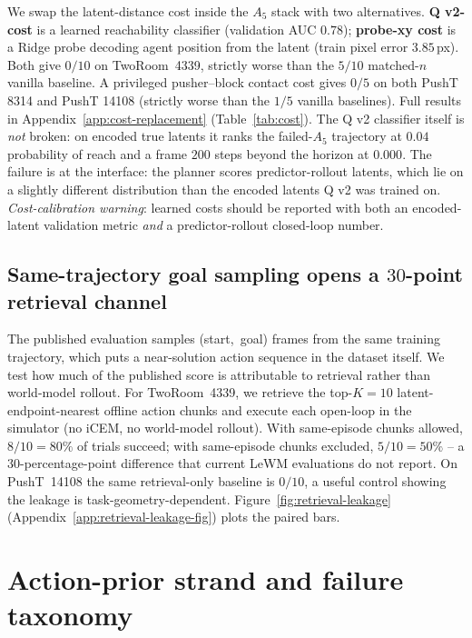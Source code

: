 \documentclass{article}
\begin{document}
We swap the latent-distance cost inside the $A_5$ stack with two alternatives. \textbf{Q v2-cost} is a learned reachability classifier (validation AUC $0.78$); \textbf{probe-xy cost} is a Ridge probe decoding agent position from the latent (train pixel error $3.85$\,px). Both give $0/10$ on TwoRoom~4339, strictly worse than the $5/10$ matched-$n$ vanilla baseline. A privileged pusher--block contact cost gives $0/5$ on both PushT 8314 and PushT 14108 (strictly worse than the $1/5$ vanilla baselines). Full results in Appendix~\ref{app:cost-replacement} (Table~\ref{tab:cost}). The Q v2 classifier itself is \emph{not} broken: on encoded true latents it ranks the failed-$A_5$ trajectory at $0.04$ probability of reach and a frame $200$ steps beyond the horizon at $0.000$. The failure is at the interface: the planner scores predictor-rollout latents, which lie on a slightly different distribution than the encoded latents Q v2 was trained on. \emph{Cost-calibration warning}: learned costs should be reported with both an encoded-latent validation metric \emph{and} a predictor-rollout closed-loop number.

\subsection{Same-trajectory goal sampling opens a $30$-point retrieval channel}
\label{subsec:leakage}

The published evaluation samples (start,~goal) frames from the same training trajectory, which puts a near-solution action sequence in the dataset itself. We test how much of the published score is attributable to retrieval rather than world-model rollout. For TwoRoom~4339, we retrieve the top-$K{=}10$ latent-endpoint-nearest offline action chunks and execute each open-loop in the simulator (no iCEM, no world-model rollout). With same-episode chunks allowed, $8/10 = 80\%$ of trials succeed; with same-episode chunks excluded, $5/10 = 50\%$ -- a $30$-percentage-point difference that current LeWM evaluations do not report. On PushT~14108 the same retrieval-only baseline is $0/10$, a useful control showing the leakage is task-geometry-dependent. Figure~\ref{fig:retrieval-leakage} (Appendix~\ref{app:retrieval-leakage-fig}) plots the paired bars.

\section{Action-prior strand and failure taxonomy}
\label{sec:taxonomy}
\end{document}
